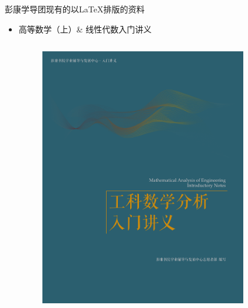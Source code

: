 \begin{frame}{彭康学导团现有的以\LaTeX 排版的资料}
    \begin{itemize}
        \item 高等数学（上）\& 线性代数入门讲义  
        \begin{columns}
            \begin{column}{0.48\textwidth}
                \begin{figure}
                    \centering
                    \includegraphics[scale=0.2]{figures/PK_GS.pdf}
                \end{figure}
            \end{column}
            \begin{column}{0.48\textwidth}
                \begin{figure}
                    \centering

\end{figure}
\end{column}
\end{columns}
\end{itemize}
\end{frame}
